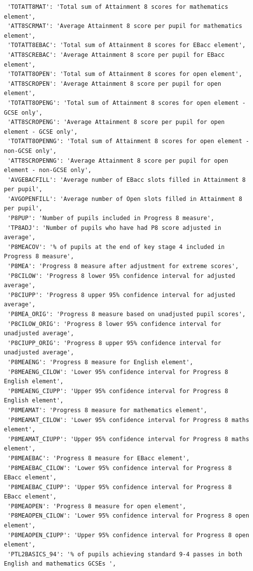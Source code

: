 \documentclass[
  letterpaper,
  DIV=11,
  numbers=noendperiod]{scrartcl}
\begin{document}
\begin{verbatim}
 'TOTATT8MAT': 'Total sum of Attainment 8 scores for mathematics element',
 'ATT8SCRMAT': 'Average Attainment 8 score per pupil for mathematics element',
 'TOTATT8EBAC': 'Total sum of Attainment 8 scores for EBacc element',
 'ATT8SCREBAC': 'Average Attainment 8 score per pupil for EBacc element',
 'TOTATT8OPEN': 'Total sum of Attainment 8 scores for open element',
 'ATT8SCROPEN': 'Average Attainment 8 score per pupil for open element',
 'TOTATT8OPENG': 'Total sum of Attainment 8 scores for open element - GCSE only',
 'ATT8SCROPENG': 'Average Attainment 8 score per pupil for open element - GCSE only',
 'TOTATT8OPENNG': 'Total sum of Attainment 8 scores for open element - non-GCSE only',
 'ATT8SCROPENNG': 'Average Attainment 8 score per pupil for open element - non-GCSE only',
 'AVGEBACFILL': 'Average number of EBacc slots filled in Attainment 8 per pupil',
 'AVGOPENFILL': 'Average number of Open slots filled in Attainment 8 per pupil',
 'P8PUP': 'Number of pupils included in Progress 8 measure',
 'TP8ADJ': 'Number of pupils who have had P8 score adjusted in average',
 'P8MEACOV': '% of pupils at the end of key stage 4 included in Progress 8 measure',
 'P8MEA': 'Progress 8 measure after adjustment for extreme scores',
 'P8CILOW': 'Progress 8 lower 95% confidence interval for adjusted average',
 'P8CIUPP': 'Progress 8 upper 95% confidence interval for adjusted average',
 'P8MEA_ORIG': 'Progress 8 measure based on unadjusted pupil scores',
 'P8CILOW_ORIG': 'Progress 8 lower 95% confidence interval for unadjusted average',
 'P8CIUPP_ORIG': 'Progress 8 upper 95% confidence interval for unadjusted average',
 'P8MEAENG': 'Progress 8 measure for English element',
 'P8MEAENG_CILOW': 'Lower 95% confidence interval for Progress 8 English element',
 'P8MEAENG_CIUPP': 'Upper 95% confidence interval for Progress 8 English element',
 'P8MEAMAT': 'Progress 8 measure for mathematics element',
 'P8MEAMAT_CILOW': 'Lower 95% confidence interval for Progress 8 maths element',
 'P8MEAMAT_CIUPP': 'Upper 95% confidence interval for Progress 8 maths element',
 'P8MEAEBAC': 'Progress 8 measure for EBacc element',
 'P8MEAEBAC_CILOW': 'Lower 95% confidence interval for Progress 8 EBacc element',
 'P8MEAEBAC_CIUPP': 'Upper 95% confidence interval for Progress 8 EBacc element',
 'P8MEAOPEN': 'Progress 8 measure for open element',
 'P8MEAOPEN_CILOW': 'Lower 95% confidence interval for Progress 8 open element',
 'P8MEAOPEN_CIUPP': 'Upper 95% confidence interval for Progress 8 open element',
 'PTL2BASICS_94': '% of pupils achieving standard 9-4 passes in both English and mathematics GCSEs ',

\end{verbatim}
\end{document}
